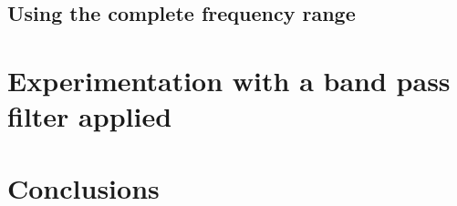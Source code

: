 \documentclass[12pt]{article}
\begin{document}
\medskip


\subsection{Using the complete frequency range}\label{Experiment_1}

\section{Experimentation with a band pass filter applied}\label{Experiment_2}


\section{Conclusions}\label{Conclusions}








\end{document}
